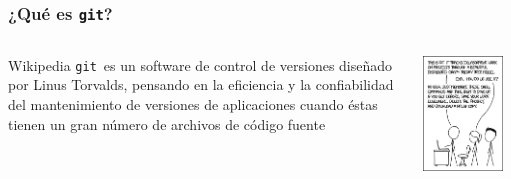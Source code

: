 \documentclass{beamer}
\newcommand{\git}{\texttt{git}}
\begin{document}
\begin{frame}\frametitle{¿Qué es \git?}
	\begin{columns}
		\begin{column}{0.5\textwidth}
			\begin{block}{Wikipedia}
				\git\ es un software de control de versiones diseñado por Linus Torvalds, pensando en la eficiencia y la confiabilidad del mantenimiento de versiones de aplicaciones cuando éstas tienen un gran número de archivos de código fuente
			\end{block}
		\end{column}
		\begin{column}{0.5\textwidth}
			\centering
			\includegraphics[width=0.9\textwidth]{fig/git}
		\end{column}
	\end{columns}
\end{frame}
\end{document}
